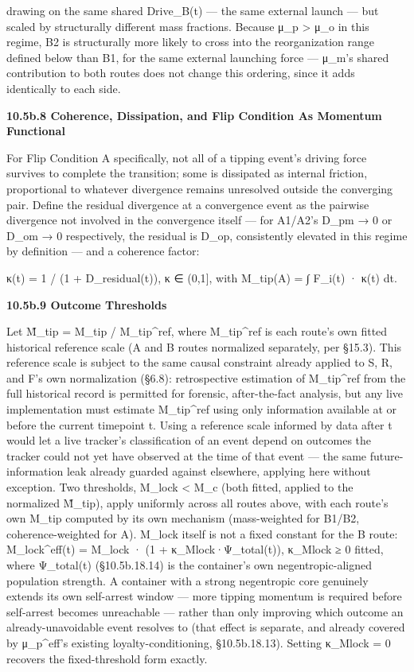 \documentclass[
]{article}
\begin{document}
drawing on the same shared Drive\_B(t) --- the same external launch ---
but scaled by structurally different mass fractions. Because μ\_p
\textgreater{} μ\_o in this regime, B2 is structurally more likely to
cross into the reorganization range defined below than B1, for the same
external launching force --- μ\_m's shared contribution to both routes
does not change this ordering, since it adds identically to each side.

\textbf{10.5b.8 Coherence, Dissipation, and Flip Condition
A\textquotesingle s Momentum Functional}

For Flip Condition A specifically, not all of a tipping event's driving
force survives to complete the transition; some is dissipated as
internal friction, proportional to whatever divergence remains
unresolved outside the converging pair. Define the residual divergence
at a convergence event as the pairwise divergence not involved in the
convergence itself --- for A1/A2's D\_pm → 0 or D\_om → 0 respectively,
the residual is D\_op, consistently elevated in this regime by
definition --- and a coherence factor:

κ(t) = 1 / (1 + D\_residual(t)), κ ∈ (0,1{]}, with M\_tip(A) = ∫
\textbar F\_i(t)\textbar{} · κ(t) dt.

\textbf{10.5b.9 Outcome Thresholds}

Let M̃\_tip = M\_tip / M\_tip\^{}ref, where M\_tip\^{}ref is each route's
own fitted historical reference scale (A and B routes normalized
separately, per §15.3). This reference scale is subject to the same
causal constraint already applied to S, R, and F's own normalization
(§6.8): retrospective estimation of M\_tip\^{}ref from the full
historical record is permitted for forensic, after-the-fact analysis,
but any live implementation must estimate M\_tip\^{}ref using only
information available at or before the current timepoint t. Using a
reference scale informed by data after t would let a live tracker's
classification of an event depend on outcomes the tracker could not yet
have observed at the time of that event --- the same future-information
leak already guarded against elsewhere, applying here without exception.
Two thresholds, M\_lock \textless{} M\_c (both fitted, applied to the
normalized M̃\_tip), apply uniformly across all routes above, with each
route's own M\_tip computed by its own mechanism (mass-weighted for
B1/B2, coherence-weighted for A). M\_lock itself is not a fixed constant
for the B route: M\_lock\^{}eff(t) = M\_lock · (1 +
κ\_Mlock·Ψ\_total(t)), κ\_Mlock ≥ 0 fitted, where Ψ\_total(t)
(§10.5b.18.14) is the container's own negentropic-aligned population
strength. A container with a strong negentropic core genuinely extends
its own self-arrest window --- more tipping momentum is required before
self-arrest becomes unreachable --- rather than only improving which
outcome an already-unavoidable event resolves to (that effect is
separate, and already covered by μ\_p\^{}eff's existing
loyalty-conditioning, §10.5b.18.13). Setting κ\_Mlock = 0 recovers the
fixed-threshold form exactly.
\end{document}
